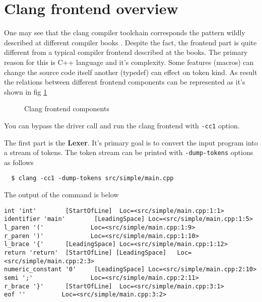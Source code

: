 \section{Clang frontend overview}
One may see that the clang compiler toolchain corresponds the pattern
wildly described at different compiler books
\cite{book:engineering_a_compiler}. Despite the fact, the frontend
part is quite different from a typical compiler frontend described at
the books. The primary reason for this is C++ language and it's
complexity. Some features (macros) can change the source code itself
another (typedef) can effect on token kind. As result the relations
between different frontend components can be represented as it's shown
in fig \ref{fig:clang_frontend}
\begin{figure}
\begin{center}
\end{center}
  \caption{Clang frontend components}
  \label{fig:clang_frontend}
\end{figure}

You can bypass the driver call and run the clang frontend  with
\texttt{-cc1} option. 

The first part is the \textbf{Lexer}. It's primary goal is to convert the input
program into a stream of tokens. The token stream can be printed with
\texttt{-dump-tokens} options as follows
\begin{verbatim}
  $ clang -cc1 -dump-tokens src/simple/main.cpp
\end{verbatim}
The output of the command is below
\begin{verbatim}
int 'int'        [StartOfLine]  Loc=<src/simple/main.cpp:1:1>
identifier 'main'        [LeadingSpace] Loc=<src/simple/main.cpp:1:5>
l_paren '('             Loc=<src/simple/main.cpp:1:9>
r_paren ')'             Loc=<src/simple/main.cpp:1:10>
l_brace '{'      [LeadingSpace] Loc=<src/simple/main.cpp:1:12>
return 'return'  [StartOfLine] [LeadingSpace]   Loc=<src/simple/main.cpp:2:3>
numeric_constant '0'     [LeadingSpace] Loc=<src/simple/main.cpp:2:10>
semi ';'                Loc=<src/simple/main.cpp:2:11>
r_brace '}'      [StartOfLine]  Loc=<src/simple/main.cpp:3:1>
eof ''          Loc=<src/simple/main.cpp:3:2>
\end{verbatim}

